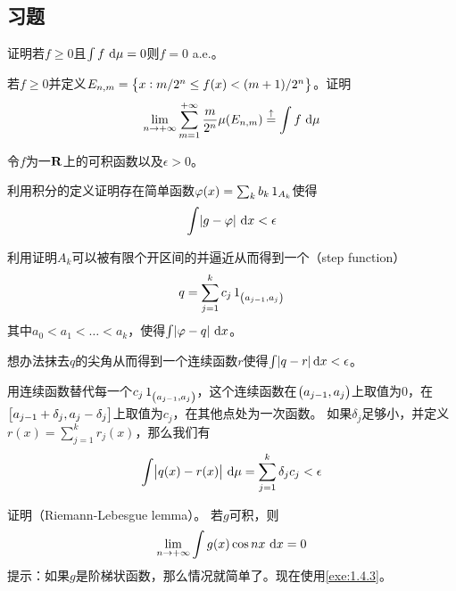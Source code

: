 \documentclass[../main.tex]{subfiles}
\begin{document}
\subsection*{习题}
\begin{exercise}
	\item 证明若\(f\geq 0\)且\(\int f\,\dif\mu=0\)则\(f=0\) a.e.。
	\item \label{exe:1.4.3} 若\(f\geq0\)并定义\(E_{n,m}=\cbr{x:m/2^n\leq f(x)<(m+1)/2^n}\)。证明
	\[\lim\limits_{n\rightarrow+\infty}\sum_{m=1}^{+\infty}\frac{m}{2^n}\mu(E_{n,m})\stackrel{\uparrow}{=}\int f\,\dif\mu\]
	\item 令\(f\)为一\(\mathbf{R}\)上的可积函数以及\(\epsilon>0\)。
	\begin{exercise}
		\item
		利用积分的定义证明存在简单函数\(\varphi(x)=\sum_kb_k\operatorname{1}_{A_k}\)使得\[\int\envert{g-\varphi}\,\dif x<\epsilon\]
		\item 利用证明\(A_k\)可以被有限个开区间的并逼近从而得到一个（step function）
		\[q=\sum_{j=1}^kc_j\indicator_{\intoo{a_{j-1},a_j}}\]
		其中\(a_0<a_1<\dots<a_k\)，使得\(\int\envert{\varphi-q}\,\dif x\)。
		\item 想办法抹去\(q\)的尖角从而得到一个连续函数\(r\)使得\(\int\envert{q-r}\dif x<\epsilon\)。
		\item 用连续函数替代每一个\(c_j\indicator_{\intoo{a_{j-1},a_j}}\)，这个连续函数在\(\intoo{a_{j-1},a_j}\)上取值为\(0\)，在\(\intcc{a_{j-1}+\delta_j,a_j-\delta_j}\)上取值为\(c_j\)，在其他点处为一次函数。
		如果\(\delta_j\)足够小，并定义\(r(x)=\sum_{j=1}^kr_j(x)\)，那么我们有
		\[\int\envert{q(x)-r(x)}\,\dif\mu=\sum_{j=1}^k\delta_jc_j<\epsilon\]
	\end{exercise}
	\item 证明（Riemann-Lebesgue lemma）。
	若\(g\)可积，则
	\[\lim\limits_{n\rightarrow+\infty}\int g(x)\cos nx\,\dif x=0\]
	提示：如果\(g\)是阶梯状函数，那么情况就简单了。现在使用\ref{exe:1.4.3}。
\end{exercise}
\end{document}
